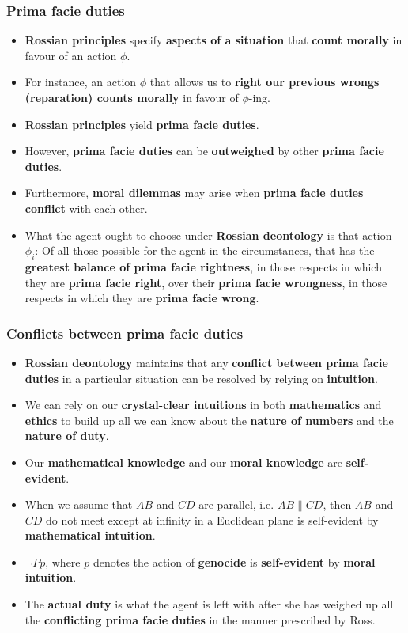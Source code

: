 \documentclass[11pt]{article}
\begin{document}
\subsubsection{Prima facie duties}
\label{sec:org228898d}
\begin{itemize}
\item \textbf{Rossian principles} specify \textbf{aspects of a situation} that \textbf{count morally} in favour of an action \(\phi\).
\item For instance, an action \(\phi\) that allows us to \textbf{right our previous wrongs (reparation) counts morally} in favour of \(\phi\)-ing.
\item \textbf{Rossian principles} yield \textbf{prima facie duties}.
\item However, \textbf{prima facie duties} can be \textbf{outweighed} by other \textbf{prima facie duties}.
\item Furthermore, \textbf{moral dilemmas} may arise when \textbf{prima facie duties conflict} with each other.
\item What the agent ought to choose under \textbf{Rossian deontology} is that action \(\phi_i\):
Of all those possible for the agent in the circumstances, that has the \textbf{greatest balance of prima facie rightness}, in those respects in which they are \textbf{prima facie right}, over their \textbf{prima facie wrongness}, in those respects in which they are \textbf{prima facie wrong}.
\end{itemize}
\subsubsection{Conflicts between prima facie duties}
\label{sec:orgb21e245}
\begin{itemize}
\item \textbf{Rossian deontology} maintains that any \textbf{conflict between prima facie duties} in a particular situation can be resolved by relying on \textbf{intuition}.
\item We can rely on our \textbf{crystal-clear intuitions} in both \textbf{mathematics} and \textbf{ethics} to build up all we can know about the \textbf{nature of numbers} and the \textbf{nature of duty}.
\item Our \textbf{mathematical knowledge} and our \textbf{moral knowledge} are \textbf{self-evident}.
\item When we assume that \(AB\) and \(CD\) are parallel, i.e. \(AB \parallel CD\), then \(AB\) and \(CD\) do not meet except at infinity in a Euclidean plane is self-evident by \textbf{mathematical intuition}.
\item \(\neg Pp\), where \(p\) denotes the action of \textbf{genocide} is \textbf{self-evident} by \textbf{moral intuition}.
\item The \textbf{actual duty} is what the agent is left with after she has weighed up all the \textbf{conflicting prima facie duties} in the manner prescribed by Ross.
\end{itemize}
\end{document}
